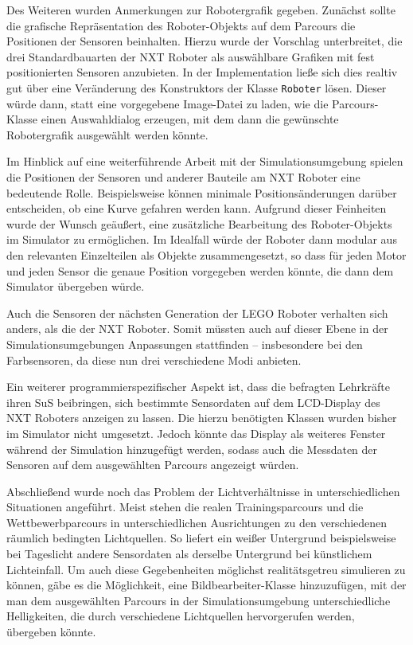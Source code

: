\documentclass[paper=a4, DIV=calc, BCOR=12mm, twoside=on, onecolumn=on, open = right, titlepage =on, parskip =half-, headsepline = on, footsepline = off, chapterprefix = off, appendixprefix = on, fontsize = 12pt, numbers = noenddot, abstract = on]{scrbook}
\begin{document}
Des Weiteren wurden Anmerkungen zur Robotergrafik gegeben. Zunächst sollte die grafische Repräsentation des Roboter-Objekts auf dem Parcours die Positionen der Sensoren beinhalten. Hierzu wurde der Vorschlag unterbreitet, die drei Standardbauarten der NXT Roboter als auswählbare Grafiken mit fest positionierten Sensoren anzubieten. In der Implementation ließe sich dies realtiv gut über eine Veränderung des Konstruktors der Klasse \texttt{Roboter} lösen. Dieser würde dann, statt eine vorgegebene Image-Datei zu laden, wie die Parcours-Klasse einen Auswahldialog erzeugen, mit dem dann die gewünschte Robotergrafik ausgewählt werden könnte.

Im Hinblick auf eine weiterführende Arbeit mit der Simulationsumgebung spielen die Positionen der Sensoren und anderer Bauteile am NXT Roboter eine bedeutende Rolle. Beispielsweise können minimale Positionsänderungen darüber entscheiden, ob eine Kurve gefahren werden kann. Aufgrund dieser Feinheiten wurde der Wunsch geäußert, eine zusätzliche Bearbeitung des Roboter-Objekts im Simulator zu ermöglichen. Im Idealfall würde der Roboter dann modular aus den relevanten Einzelteilen als Objekte zusammengesetzt, so dass für jeden Motor und jeden Sensor die genaue Position vorgegeben werden könnte, die dann dem Simulator übergeben würde.

Auch die Sensoren der nächsten Generation der \textsc{LEGO} Roboter verhalten sich anders, als die der NXT Roboter. Somit müssten auch auf dieser Ebene in der Simulationsumgebungen Anpassungen stattfinden -- insbesondere bei den Farbsensoren, da diese nun drei verschiedene Modi anbieten.

Ein weiterer programmierspezifischer Aspekt ist, dass die befragten Lehrkräfte ihren SuS beibringen, sich bestimmte Sensordaten auf dem LCD-Display des NXT Roboters anzeigen zu lassen. Die hierzu benötigten Klassen wurden bisher im Simulator nicht umgesetzt. Jedoch könnte das Display als weiteres Fenster während der Simulation hinzugefügt werden, sodass auch die Messdaten der Sensoren auf dem ausgewählten Parcours angezeigt würden. 

Abschließend wurde noch das Problem der Lichtverhältnisse in unterschiedlichen Situationen angeführt. Meist stehen die realen Trainingsparcours und die Wettbewerbparcours in unterschiedlichen Ausrichtungen zu den verschiedenen räumlich bedingten Lichtquellen. So liefert ein weißer Untergrund beispielsweise bei Tageslicht andere Sensordaten als derselbe Untergrund bei künstlichem Lichteinfall. Um auch diese Gegebenheiten möglichst realitätsgetreu simulieren zu können, gäbe es die Möglichkeit, eine Bildbearbeiter-Klasse hinzuzufügen, mit der man dem ausgewählten Parcours in der Simulationsumgebung unterschiedliche Helligkeiten, die durch verschiedene Lichtquellen hervorgerufen werden, übergeben könnte.
\end{document}
